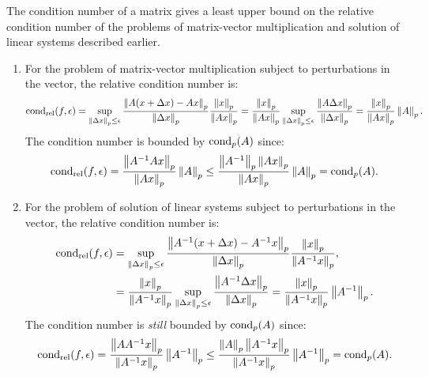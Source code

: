 The condition number of a matrix gives a least upper bound on the relative condition number of the problems of matrix-vector multiplication and solution of linear systems described earlier.

\begin{example}
\begin{enumerate}
\item For the problem of matrix-vector multiplication subject to perturbations in the vector, the relative condition number is:
\[
\operatorname{cond}_{\rm rel}(f,\epsilon) = \sup_{\left\|{\Delta x}\right\|_p \le \epsilon}\dfrac{\left\|{A(x+\Delta x)-Ax}\right\|_p}{\left\|{\Delta x}\right\|_p}\dfrac{\left\|{x}\right\|_p}{\left\|{Ax}\right\|_p} = \dfrac{\left\|{x}\right\|_p}{\left\|{Ax}\right\|_p}\sup_{\left\|{\Delta x}\right\|_p \le \epsilon}\dfrac{\left\|{A\Delta x}\right\|_p}{\left\|{\Delta x}\right\|_p} = \dfrac{\left\|{x}\right\|_p}{\left\|{Ax}\right\|_p}\left\|{A}\right\|_p.
\]
The condition number is bounded by $\operatorname{cond}_p(A)$ since:
\[
\operatorname{cond}_{\rm rel}(f,\epsilon) = \dfrac{\left\|{A^{-1} Ax}\right\|_p}{\left\|{Ax}\right\|_p}\left\|{A}\right\|_p \le \dfrac{\left\|{A^{-1}}\right\|_p\left\|{Ax}\right\|_p}{\left\|{Ax}\right\|_p}\left\|{A}\right\|_p = \operatorname{cond}_p(A).
\]
\item For the problem of solution of linear systems subject to perturbations in the vector, the relative condition number is:
\begin{align*}
\operatorname{cond}_{\rm rel}(f,\epsilon) & = \sup_{\left\|{\Delta x}\right\|_p \le \epsilon}\dfrac{\left\|{A^{-1}(x+\Delta x)-A^{-1}x}\right\|_p}{\left\|{\Delta x}\right\|_p}\dfrac{\left\|{x}\right\|_p}{\left\|{A^{-1}x}\right\|_p},\\
& = \dfrac{\left\|{x}\right\|_p}{\left\|{A^{-1}x}\right\|_p}\sup_{\left\|{\Delta x}\right\|_p \le \epsilon}\dfrac{\left\|{A^{-1}\Delta x}\right\|_p}{\left\|{\Delta x}\right\|_p} = \dfrac{\left\|{x}\right\|_p}{\left\|{A^{-1}x}\right\|_p}\left\|{A^{-1}}\right\|_p.
\end{align*}
The condition number is {\em still} bounded by $\operatorname{cond}_p(A)$ since:
\[
\operatorname{cond}_{\rm rel}(f,\epsilon) = \dfrac{\left\|{AA^{-1}x}\right\|_p}{\left\|{A^{-1}x}\right\|_p}\left\|{A^{-1}}\right\|_p \le \dfrac{\left\|{A}\right\|_p\left\|{A^{-1}x}\right\|_p}{\left\|{A^{-1}x}\right\|_p}\left\|{A^{-1}}\right\|_p = \operatorname{cond}_p(A).
\]
\end{enumerate}
\end{example}

